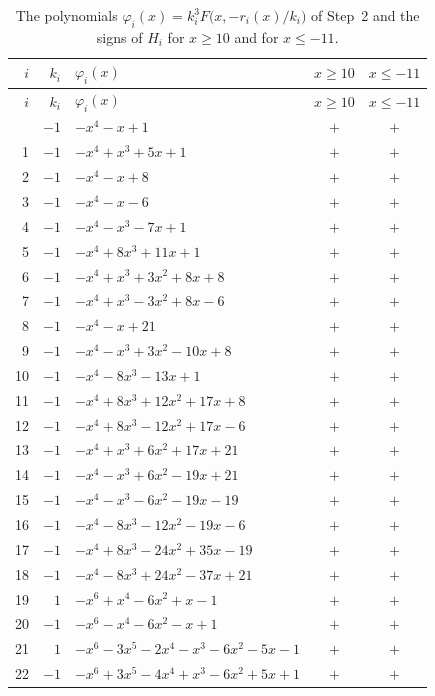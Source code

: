 \documentclass[11pt]{article}
\begin{document}
\begingroup\footnotesize
\setlength{\LTcapwidth}{\textwidth}
\begin{longtable}{@{}rrlcc@{}}
\caption{The polynomials $\varphi_i(x)=k_i^3F\bigl(x,-r_i(x)/k_i\bigr)$ of Step~2 and the signs of $H_i$ for $x\geq10$ and for $x\leq-11$.}\label{tab:phi}\\
\hline $i$ & $k_i$ & $\varphi_i(x)$ & $x\geq10$ & $x\leq-11$\\\hline\endfirsthead\hline $i$ & $k_i$ & $\varphi_i(x)$ & $x\geq10$ & $x\leq-11$\\\hline\endhead\hline\endfoot
0 & $-1$ & $-x^{4}-x+1$ & $+$ & $+$\\
1 & $-1$ & $-x^{4}+x^{3}+5x+1$ & $+$ & $+$\\
2 & $-1$ & $-x^{4}-x+8$ & $+$ & $+$\\
3 & $-1$ & $-x^{4}-x-6$ & $+$ & $+$\\
4 & $-1$ & $-x^{4}-x^{3}-7x+1$ & $+$ & $+$\\
5 & $-1$ & $-x^{4}+8x^{3}+11x+1$ & $+$ & $+$\\
6 & $-1$ & $-x^{4}+x^{3}+3x^{2}+8x+8$ & $+$ & $+$\\
7 & $-1$ & $-x^{4}+x^{3}-3x^{2}+8x-6$ & $+$ & $+$\\
8 & $-1$ & $-x^{4}-x+21$ & $+$ & $+$\\
9 & $-1$ & $-x^{4}-x^{3}+3x^{2}-10x+8$ & $+$ & $+$\\
10 & $-1$ & $-x^{4}-8x^{3}-13x+1$ & $+$ & $+$\\
11 & $-1$ & $-x^{4}+8x^{3}+12x^{2}+17x+8$ & $+$ & $+$\\
12 & $-1$ & $-x^{4}+8x^{3}-12x^{2}+17x-6$ & $+$ & $+$\\
13 & $-1$ & $-x^{4}+x^{3}+6x^{2}+17x+21$ & $+$ & $+$\\
14 & $-1$ & $-x^{4}-x^{3}+6x^{2}-19x+21$ & $+$ & $+$\\
15 & $-1$ & $-x^{4}-x^{3}-6x^{2}-19x-19$ & $+$ & $+$\\
16 & $-1$ & $-x^{4}-8x^{3}-12x^{2}-19x-6$ & $+$ & $+$\\
17 & $-1$ & $-x^{4}+8x^{3}-24x^{2}+35x-19$ & $+$ & $+$\\
18 & $-1$ & $-x^{4}-8x^{3}+24x^{2}-37x+21$ & $+$ & $+$\\
19 & $1$ & $-x^{6}+x^{4}-6x^{2}+x-1$ & $+$ & $+$\\
20 & $-1$ & $-x^{6}-x^{4}-6x^{2}-x+1$ & $+$ & $+$\\
21 & $1$ & $-x^{6}-3x^{5}-2x^{4}-x^{3}-6x^{2}-5x-1$ & $+$ & $+$\\
22 & $-1$ & $-x^{6}+3x^{5}-4x^{4}+x^{3}-6x^{2}+5x+1$ & $+$ & $+$\\

\end{longtable}
\end{document}
